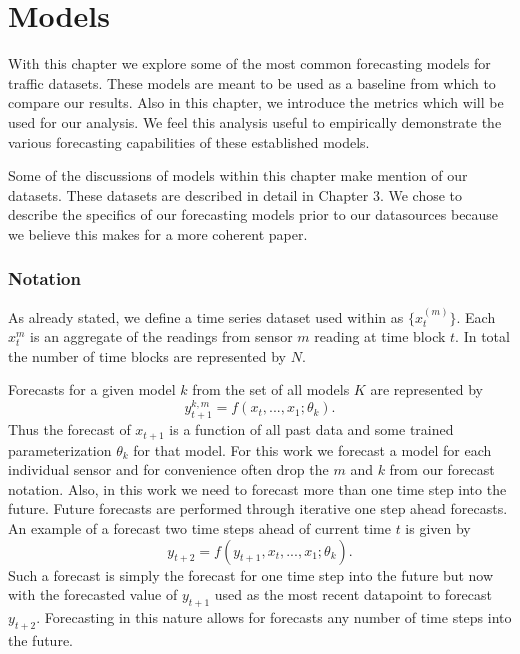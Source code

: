 \chapter{Models}
With this chapter we explore some of the most common forecasting models for traffic datasets.  These models are meant to be used as a baseline from which to compare our results. Also in this chapter, we introduce the metrics which will be used for our analysis.  We feel this analysis useful to empirically demonstrate the various forecasting capabilities of these established models.

Some of the discussions of models within this chapter make mention of our datasets.  These datasets are described in detail in Chapter 3.  We chose to describe the specifics of our forecasting models prior to our datasources because we believe this makes for a more coherent paper.

\subsection{Notation}
As already stated, we define a time series dataset used within as  $\{x_{t}^{(m)}\}$.  Each $x_{t}^{m}$ is an aggregate of the readings from sensor $m$ reading at time block $t$.  In total the number of time blocks are represented by $N$.

Forecasts for a given model $k$ from the set of all models $K$ are represented by 
\begin{equation}
y_{t + 1}^{k, m} = f(x_{t}, ..., x_{1}; \theta_{k}).
\end{equation}
\noindent
Thus the forecast of $x_{t + 1}$ is a function of all past data and some trained parameterization $\theta_{k}$ for that model.  For this work we forecast a model for each individual sensor and for convenience often drop the $m$ and $k$ from our forecast notation.  Also, in this work we need to forecast more than one time step into the future.  Future forecasts are performed through iterative one step ahead forecasts.    An example of a forecast two time steps ahead of current time $t$ is given by 
\begin{equation}
y_{t + 2} = f(y_{t + 1}, x_{t}, ..., x_{1}; \theta_{k}).
\end{equation}
\noindent
Such a forecast is simply the forecast for one time step into the future but now with the forecasted value of $y_{t + 1}$ used as the most recent datapoint to forecast $y_{t + 2}$.  Forecasting in this nature allows for forecasts any number of time steps into the future.

